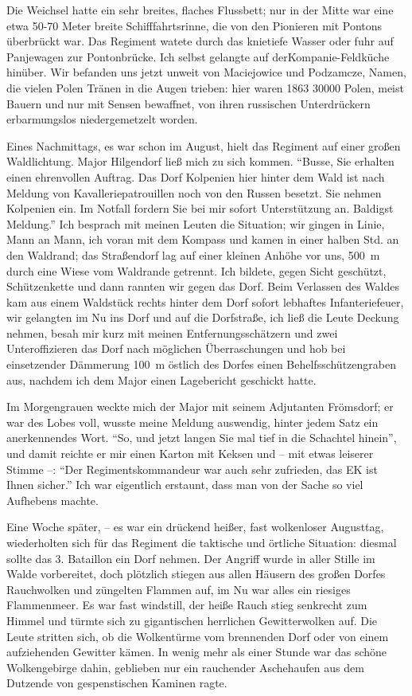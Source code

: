 Die Weichsel hatte ein sehr breites, flaches Flussbett; nur in der Mitte war eine etwa 50-70 Meter breite Schifffahrtsrinne, die von den Pionieren mit Pontons überbrückt war. Das Regiment watete durch das knietiefe Wasser oder fuhr auf Panjewagen zur Pontonbrücke. Ich selbst gelangte auf der\linebreak Kompanie-Feldküche hinüber. Wir befanden uns jetzt unweit von Maciejowice und Podzamcze, Namen, die vielen Polen Tränen in die Augen trieben: hier waren 1863 \num{30000} Polen, meist Bauern und nur mit Sensen bewaffnet, von ihren russischen Unterdrückern erbarmungslos niedergemetzelt worden.

Eines Nachmittags, es war schon im August, hielt das Regiment auf einer großen Waldlichtung. Major Hilgendorf ließ mich zu sich kommen. \enquote{Busse, Sie erhalten einen ehrenvollen Auftrag. Das Dorf Kolpenien hier hinter dem Wald ist nach Meldung von Kavalleriepatrouillen noch von den Russen besetzt. Sie nehmen Kolpenien ein. Im Notfall fordern Sie bei mir sofort Unterstützung an. Baldigst Meldung.} Ich besprach mit meinen Leuten die Situation; wir gingen in Linie, Mann an Mann, ich voran mit dem Kompass und kamen in einer halben Std. an den Waldrand; das Straßendorf lag auf einer kleinen Anhöhe vor uns, 500~m durch eine Wiese vom Waldrande getrennt. Ich bildete, gegen Sicht geschützt, Schützenkette und dann rannten wir gegen das Dorf. Beim Verlassen des Waldes kam aus einem Waldstück rechts hinter dem Dorf sofort lebhaftes Infanteriefeuer, wir gelangten im Nu ins Dorf und auf die Dorfstraße, ich ließ die Leute Deckung nehmen, besah mir kurz mit meinen Entfernungsschätzern und zwei Unteroffizieren das Dorf nach möglichen Überraschungen und hob bei einsetzender Dämmerung 100~m östlich des Dorfes einen Behelfsschützengraben aus, nachdem ich dem Major einen Lagebericht geschickt hatte.

Im Morgengrauen weckte mich der Major mit seinem Adjutanten Frömsdorf; er war des Lobes voll, wusste meine Meldung auswendig, hinter jedem Satz ein anerkennendes Wort. \enquote{So, und jetzt langen Sie mal tief in die Schachtel hinein}, und damit reichte er mir einen Karton mit Keksen und -- mit etwas leiserer Stimme --: \enquote{Der Regimentskommandeur war auch sehr zufrieden, das EK ist Ihnen sicher.} Ich war eigentlich erstaunt, dass man von der Sache so viel Aufhebens machte.

Eine Woche später, -- es war ein drückend heißer, fast wolkenloser Augusttag, wiederholten sich für das Regiment die taktische und örtliche Situation: diesmal sollte das 3. Bataillon ein Dorf nehmen. Der Angriff wurde in aller Stille im Walde vorbereitet, doch plötzlich stiegen aus allen Häusern des großen Dorfes Rauchwolken und züngelten Flammen auf, im Nu war alles ein riesiges Flammenmeer. Es war fast windstill, der heiße Rauch stieg senkrecht zum Himmel und türmte sich zu gigantischen herrlichen Gewitterwolken auf. Die Leute stritten sich, ob die Wolkentürme vom brennenden Dorf oder von einem aufziehenden Gewitter kämen. In wenig mehr als einer Stunde war das schöne Wolkengebirge dahin, geblieben nur ein rauchender Aschehaufen aus dem Dutzende von gespenstischen Kaminen ragte.

